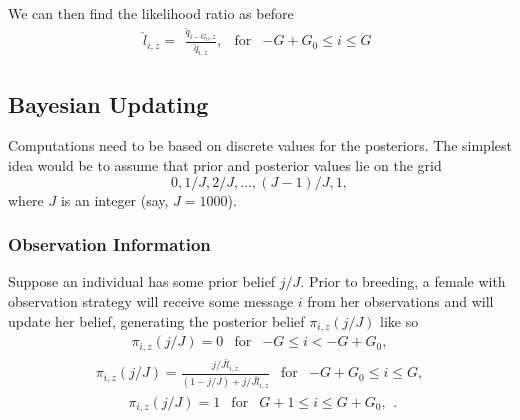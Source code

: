 \documentclass[10pt]{article}
\begin{document}
We can then find the likelihood ratio as before
\begin{equation}
	\check{l}_{i,z}=\begin{array}{ccc}
		\frac{\check{q}_{i-G_{0},z}}{\check{q}_{i,z}}, & \text{for} & -G+G_{0}\leq i\leq G\end{array}\label{eq:-11}
\end{equation}


\subsection{Bayesian Updating}

Computations need to be based on discrete values for the posteriors.
The simplest idea would be to assume that prior and posterior values
lie on the grid
\[
0,1/J,2/J,...,(J-1)/J,1,
\]
where $J$ is an integer (say, $J=1000$). 

\subsubsection{Observation Information}

Suppose an individual has some prior belief $j/J$. Prior to breeding,
a female with observation strategy will receive some message $i$
from her observations and will update her belief, generating the posterior
belief $\pi_{i,z}(j/J)$ like so
\[
\begin{array}{ccc}
	\pi_{i,z}(j/J)=0 & \text{for} & -G\leq i<-G+G_{0},\end{array}
\]
\[
\begin{array}{ccc}
	\pi_{i,z}(j/J)=\frac{j/J\check{l}_{i,z}}{(1-j/J)+j/J\check{l}_{i,z}} & \text{for} & -G+G_{0}\leq i\leq G,\end{array}
\]
\[
\begin{array}{ccc}
	\pi_{i,z}(j/J)=1 & \text{for} & G+1\leq i\leq G+G_{0},\end{array}.
\]
\end{document}

